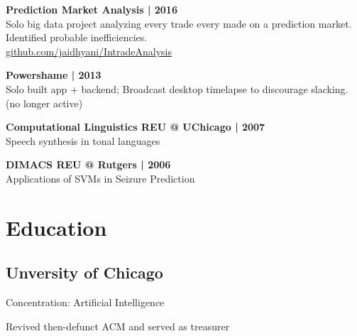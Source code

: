 \documentclass[]{resume}
\begin{document}
\begin{minipage}[t]{0.33\textwidth}
\textbf{Prediction Market Analysis | 2016}\\
Solo big data project analyzing every trade every made on a prediction market. Identified
probable inefficiencies.\\
\href{http://github.com/jaidhyani/IntradeAnalysis}{\quad github.com/jaidhyani/IntradeAnalysis }
\sectionsep

\textbf{Powershame | 2013} \\
Solo built app + backend; Broadcast desktop timelapse to discourage slacking. (no longer active)
\sectionsep

\textbf{Computational Linguistics REU @ UChicago | 2007}\\
Speech synthesis in tonal languages
\sectionsep

\textbf{DIMACS REU @ Rutgers | 2006}\\
Applications of SVMs in Seizure Prediction
\\
\section{Education}
\subsection{Unversity of Chicago}
\sectionsep
\begin{tightemize}
\item Concentration: Artificial Intelligence
\item Revived then-defunct ACM and served as treasurer
\end{tightemize}
\sectionsep


%
%

\end{minipage}
\hfill
\end{document}
